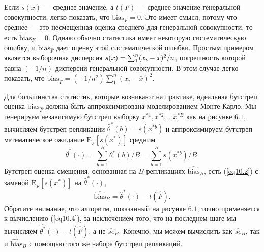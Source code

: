 Если $s(x)$ --- среднее значение, а $t(F)$ --- среднее значение генеральной совокупности, легко показать, что $\text{bias}_{\hat{F}} = 0$. Это имеет смысл, потому что среднее --- это несмещенная оценка среднего для генеральной совокупности, то есть $\text{bias}_{F} = 0$. Однако обычно статистика имеет некоторую систематическую ошибку, и $\text{bias}_{\hat{F}}$ дает оценку этой систематической ошибки. Простым примером является выборочная дисперсия $s(x) = \sum_{1}^n(x_{i} - \Bar{x})^{2}/n$, погрешность которой равна $(-1/n)$ дисперсии генеральной совокупности. В этом случае легко показать, что $\text{bias}_{\hat{F}} = (-1/n^{2})\sum_{1}^n(x_{i} - \bar{x})^{2}$.

Для большинства статистик, которые возникают на практике, идеальная бутстреп оценка $\text{bias}_{\hat{F}}$ должна быть аппроксимирована моделированием Монте-Карло. Мы генерируем независимую бутстреп выборку $x^{*1}, x^{*2}, \dots x^{*B}$ как на рисунке $6.1$, вычисляем бутстреп репликации $\hat{\theta}^{*}(b) = s(x^{*b})$ и аппроксимируем бутстреп математическое ожидание $\mathrm{E}_{\hat{F}}[s(x^{*})]$ средним
\begin{equation}\label{eq10.3} 
    \hat{\theta}^{*}(\cdot) = \sum\limits_{b=1}^{B}\hat{\theta^{*}}(b)/B = \sum\limits_{b=1}^{B} s(x^{*b})/B.
\end{equation}
Бутстреп оценка смещения, основанная на $B$ репликациях $\widehat{\text{bias}}_{B}$, есть (\ref{eq10.2}) с заменой $\mathrm{E}_{\hat{F}}[s(x^{*})]$ на $\hat{\theta}^{*}(\cdot)$,
\begin{equation}\label{eq10.4} 
   \widehat{\text{bias}}_{B} = \hat{\theta}^{*}(\cdot) - t(\hat{F}).
\end{equation}
Обратите внимание, что алгоритм, показанный на рисунке $6.1$, точно применяется к вычислению (\ref{eq10.4}), за исключением того, что на последнем шаге мы вычисляем $\hat{\theta^{*}}(\cdot) - t(\hat{F})$, а не $\widehat{se}_{B}$. Конечно, мы можем вычислить как $\widehat{se}_{B}$, так и $\widehat{\text{bias}}_{B}$ с помощью того же набора бутстреп репликаций.